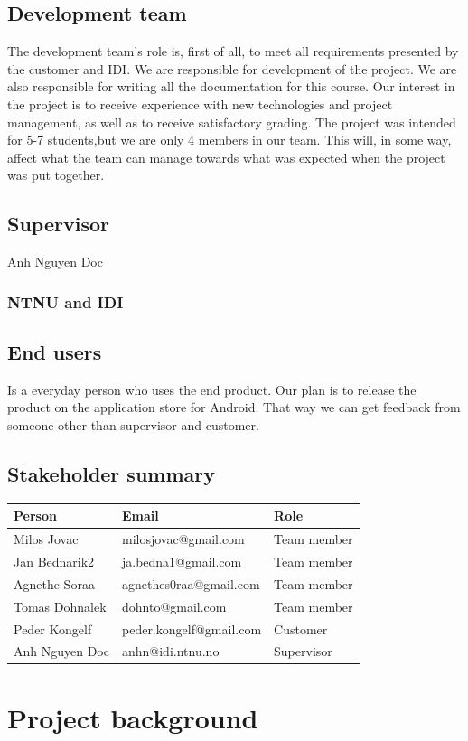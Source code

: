 \subsection{Development team}
 The development team's role is, first of all, to meet all requirements presented by the customer and IDI. We are responsible for development of the project. We are also responsible for writing all the documentation for this course.  Our interest in the project is to receive experience with new technologies and project management, as well as to receive satisfactory grading. The project was intended for 5-7 students,but we are only 4 members in our team. This will, in some way, affect what the team can manage towards what was expected when the project was put together.

\subsection{Supervisor}

Anh Nguyen Doc

\subsubsection{NTNU and IDI}

\subsection{End users}
Is a everyday person who uses the end product. Our plan is to release the product on the application store for Android. That way we can get feedback from someone other than supervisor and customer. 
\subsection{Stakeholder summary}
\begin{tabular}{l|l|l}
\textbf{Person} & \textbf{Email} & \textbf{Role}\\
\hline
Milos Jovac &  milosjovac@gmail.com & Team member  \\
Jan Bednarik2 &  ja.bedna1@gmail.com & Team member\\
Agnethe Soraa & agnethes0raa@gmail.com & Team member  \\
Tomas Dohnalek & dohnto@gmail.com & Team member \\
\hline
Peder Kongelf & peder.kongelf@gmail.com  & Customer\\
\hline
Anh Nguyen Doc	 & anhn@idi.ntnu.no & Supervisor \\
\hline

\end{tabular}

\section{Project background}